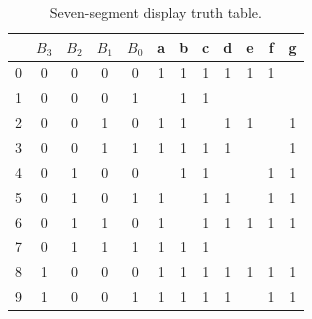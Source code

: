 \begin{table}[H]
  \begin{center}
    \caption{Seven-segment display truth table.}
    \label{tab:sevenSeg}
    \begin{tabular}{|c||c|c|c|c||c|c|c|c|c|c|c|}
      \hline
     & $B_3$ & $B_2$ & $B_1$ & $B_0$ & a & b & c & d & e & f & g \\ \hline \hline
     0& 0 & 0 & 0 & 0 & 1 & 1 & 1 & 1 & 1 & 1 &   \\ \hline %
     1& 0 & 0 & 0 & 1 &    & 1 & 1 &    &    &    &   \\ \hline %
     2& 0 & 0 & 1 & 0 & 1 & 1 &    & 1 & 1 &    & 1 \\ \hline %
     3& 0 & 0 & 1 & 1 & 1 & 1 & 1 & 1 &    &    & 1 \\ \hline %
     4& 0 & 1 & 0 & 0 &    & 1 & 1 &    &    & 1 & 1 \\ \hline %
     5& 0 & 1 & 0 & 1 & 1 &    & 1 & 1 &    & 1 & 1 \\ \hline %
     6& 0 & 1 & 1 & 0 & 1 &    & 1 & 1 & 1 & 1 & 1 \\ \hline %
     7& 0 & 1 & 1 & 1 & 1 & 1 & 1 &    &    &    &   \\ \hline %
     8& 1 & 0 & 0 & 0 & 1 & 1 & 1 & 1 & 1 & 1 & 1 \\ \hline %
     9& 1 & 0 & 0 & 1 & 1 & 1 & 1 & 1 &    & 1 & 1 \\ \hline %
    \end{tabular}
  \end{center}
\end{table}

